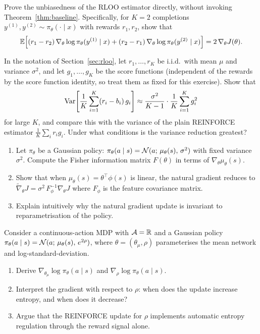 \begin{exercise}
\label{ex:rloo-unbiased-direct}
Prove the unbiasedness of the RLOO estimator directly, without invoking Theorem~\ref{thm:baseline}.  Specifically, for $K = 2$ completions $y^{(1)}, y^{(2)} \sim \pi_\theta(\cdot \mid x)$ with rewards $r_1, r_2$, show that
\[
\operatorname{\mathbb{E}}\!\left[(r_1 - r_2)\, \nabla_\theta \log \pi_\theta(y^{(1)} \mid x) + (r_2 - r_1)\, \nabla_\theta \log \pi_\theta(y^{(2)} \mid x)\right] = 2\, \nabla_\theta J(\theta).
\]
\end{exercise}

\begin{exercise}
\label{ex:rloo-variance}
In the notation of Section~\ref{sec:rloo}, let $r_1, \ldots, r_K$ be i.i.d.\ with mean $\mu$ and variance $\sigma^2$, and let $g_1, \ldots, g_K$ be the score functions (independent of the rewards by the score function identity, so treat them as fixed for this exercise).  Show that
\[
\operatorname{Var}\!\left[\frac{1}{K}\sum_{i=1}^K (r_i - b_i)\, g_i\right]
\approx \frac{\sigma^2}{K-1} \cdot \frac{1}{K}\sum_{i=1}^K g_i^2
\]
for large $K$, and compare this with the variance of the plain REINFORCE estimator $\frac{1}{K}\sum_i r_i g_i$.  Under what conditions is the variance reduction greatest?
\end{exercise}

\begin{exercise}
\label{ex:npg-fisher}
\begin{enumerate}
\item Let $\pi_\theta$ be a Gaussian policy: $\pi_\theta(a \mid s) = \mathcal{N}(a;\, \mu_\theta(s),\, \sigma^2)$ with fixed variance $\sigma^2$.  Compute the Fisher information matrix $F(\theta)$ in terms of $\nabla_\theta \mu_\theta(s)$.
\item Show that when $\mu_\theta(s) = \theta^\top \phi(s)$ is linear, the natural gradient reduces to $\tilde\nabla_\theta J = \sigma^2\, F_\phi^{-1} \nabla_\theta J$ where $F_\phi$ is the feature covariance matrix.
\item Explain intuitively why the natural gradient update is invariant to reparametrisation of the policy.
\end{enumerate}
\end{exercise}

\begin{exercise}
\label{ex:pg-continuous}
Consider a continuous-action MDP with $\mathcal{A} = \mathbb{R}$ and a Gaussian policy $\pi_\theta(a \mid s) = \mathcal{N}(a;\, \mu_\theta(s),\, e^{2\rho})$, where $\theta = (\theta_\mu, \rho)$ parameterises the mean network and log-standard-deviation.
\begin{enumerate}
\item Derive $\nabla_{\theta_\mu} \log \pi_\theta(a \mid s)$ and $\nabla_\rho \log \pi_\theta(a \mid s)$.
\item Interpret the gradient with respect to $\rho$: when does the update increase entropy, and when does it decrease?
\item Argue that the REINFORCE update for $\rho$ implements automatic entropy regulation through the reward signal alone.
\end{enumerate}
\end{exercise}

